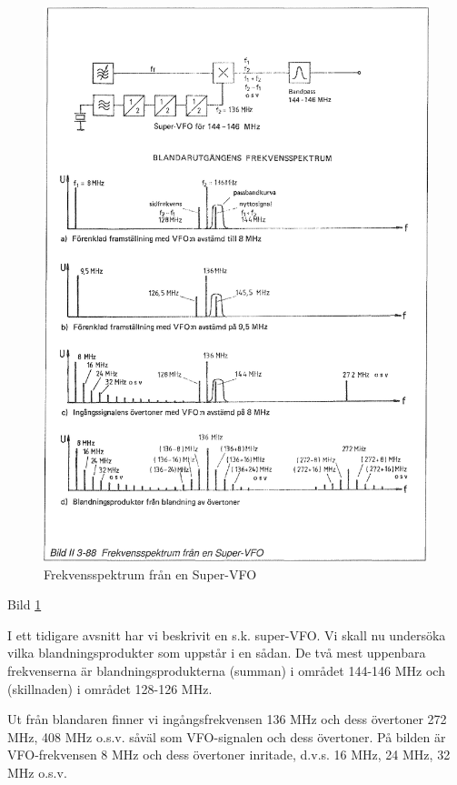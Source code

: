 \begin{figure}
\includegraphics[width=\textwidth]{images/bild_2_3-88}
\caption{Frekvensspektrum från en Super-VFO}
\label{fig:BildII3-88}
\end{figure}

Bild \ref{fig:BildII3-88}

I ett tidigare avsnitt har vi beskrivit en s.k.  super-VFO. Vi skall
nu undersöka vilka blandningsprodukter som uppstår i en sådan. De två
mest uppenbara frekvenserna är blandningsprodukterna (summan) i
området 144-146 MHz och (skillnaden) i området 128-126 MHz.

Ut från blandaren finner vi ingångsfrekvensen 136 MHz och dess
övertoner 272 MHz, 408 MHz o.s.v. såväl som VFO-signalen och dess
övertoner. På bilden är VFO-frekvensen 8 MHz och dess övertoner
inritade, d.v.s. 16 MHz, 24 MHz, 32 MHz o.s.v.

